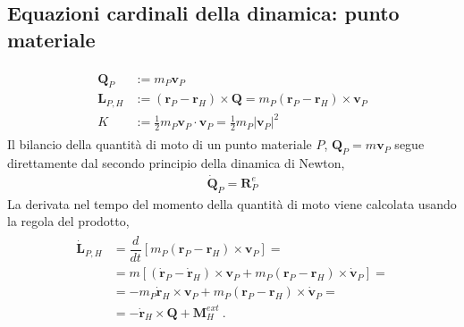 \documentclass[letterpaper,10pt,english]{jupyterBook}
\begin{document}
\subsection{Equazioni cardinali della dinamica: punto materiale}
\label{\detokenize{ch/dynamics-eom-point:equazioni-cardinali-della-dinamica-punto-materiale}}\label{\detokenize{ch/dynamics-eom-point:classical-mechanics-dynamics-eom-point}}\label{\detokenize{ch/dynamics-eom-point::doc}}
\sphinxAtStartPar
{}
\begin{equation*}
\begin{split}\begin{aligned}
  \mathbf{Q}_P & := m_P \mathbf{v}_P \\
  \mathbf{L}_{P,H} & := (\mathbf{r}_P - \mathbf{r}_H) \times \mathbf{Q} = m_P (\mathbf{r}_P - \mathbf{r}_H) \times \mathbf{v}_P \\
  K & := \frac{1}{2} m_P \mathbf{v}_P \cdot \mathbf{v}_P = \frac{1}{2} m_P |\mathbf{v}_P|^2
\end{aligned}\end{split}
\end{equation*}
\sphinxAtStartPar
{} Il bilancio della quantità di moto di un punto materiale \(P\), \(\mathbf{Q}_P = m \mathbf{v}_P\) segue direttamente dal secondo principio della dinamica di Newton,
\begin{equation*}
\begin{split}\dot{\mathbf{Q}}_P = \mathbf{R}^e_P\end{split}
\end{equation*}
\sphinxAtStartPar
{} La derivata nel tempo del momento della quantità di moto viene calcolata usando la regola del prodotto,
\begin{equation*}
\begin{split}\begin{aligned}
\dot{\mathbf{L}}_{P,H} & = \dfrac{d}{dt} \left[ m_P (\mathbf{r}_P - \mathbf{r}_H) \times \mathbf{v}_P \right] = \\
& = m \left[ ( \dot{\mathbf{r}}_P - \dot{\mathbf{r}}_H ) \times \mathbf{v}_P + m_P (\mathbf{r}_P - \mathbf{r}_H) \times \dot{\mathbf{v}}_P \right] = \\
& = - m_P \dot{\mathbf{r}}_H \times \mathbf{v}_P + m_P (\mathbf{r}_P - \mathbf{r}_H) \times \dot{\mathbf{v}}_P = \\
& = - \dot{\mathbf{r}}_H \times \mathbf{Q} + \mathbf{M}_H^{ext} \ .
\end{aligned}\end{split}
\end{equation*}
\end{document}
